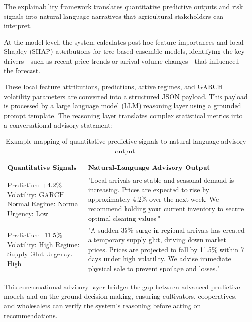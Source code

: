 \documentclass[12pt,a4paper]{report}
\theoremstyle{definition}
\theoremstyle{remark}
\begin{document}
The explainability framework translates quantitative predictive outputs and risk signals into natural-language narratives that agricultural stakeholders can interpret. 

At the model level, the system calculates post-hoc feature importances and local Shapley (SHAP) attributions for tree-based ensemble models, identifying the key drivers—such as recent price trends or arrival volume changes—that influenced the forecast.

These local feature attributions, predictions, active regimes, and GARCH volatility parameters are converted into a structured JSON payload. This payload is processed by a large language model (LLM) reasoning layer using a grounded prompt template. The reasoning layer translates complex statistical metrics into a conversational advisory statement:

\begin{table}[htbp]
\centering
\caption{Example mapping of quantitative predictive signals to natural-language advisory output.}
\label{tab:explainability_mapping}
\begin{tabular}{p{5.5cm}|p{9.5cm}}
\hline
\textbf{Quantitative Signals} & \textbf{Natural-Language Advisory Output} \\
\hline
Prediction: +4.2\% \newline Volatility: GARCH Normal \newline Regime: Normal \newline Urgency: Low & "Local arrivals are stable and seasonal demand is increasing. Prices are expected to rise by approximately 4.2\% over the next week. We recommend holding your current inventory to secure optimal clearing values." \\
\hline
Prediction: -11.5\% \newline Volatility: High \newline Regime: Supply Glut \newline Urgency: High & "A sudden 35\% surge in regional arrivals has created a temporary supply glut, driving down market prices. Prices are projected to fall by 11.5\% within 7 days under high volatility. We advise immediate physical sale to prevent spoilage and losses." \\
\hline
\end{tabular}
\end{table}

This conversational advisory layer bridges the gap between advanced predictive models and on-the-ground decision-making, ensuring cultivators, cooperatives, and wholesalers can verify the system's reasoning before acting on recommendations.
\end{document}

